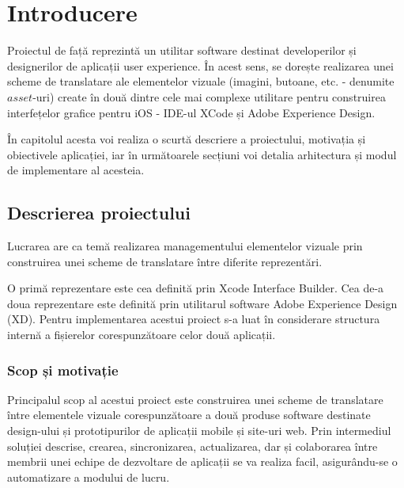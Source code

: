 \renewcommand{\chaptername}{Capitolul}
\renewcommand{\bibname}{Bibliografie}

\chapter{Introducere}
\label{chapter:intro}

\par Proiectul de față reprezintă un utilitar software destinat developerilor și designerilor de aplicații user experience. În acest sens, se dorește realizarea unei scheme de translatare ale elementelor vizuale (imagini, butoane, etc. - denumite $asset$-uri) create în două dintre cele mai complexe utilitare pentru construirea interfețelor grafice pentru iOS -  IDE-ul XCode și  Adobe Experience Design.
\par În capitolul acesta voi realiza o scurtă descriere a proiectului, motivația și obiectivele aplicației, iar în următoarele secțiuni voi detalia arhitectura și modul de implementare al acesteia.

\section{Descrierea proiectului}
\label{sec:proj}
\par Lucrarea are ca temă realizarea managementului elementelor vizuale prin construirea unei scheme de translatare între diferite reprezentări.  
\par O primă reprezentare este cea definită prin Xcode Interface Builder. Cea de-a doua reprezentare este definită prin utilitarul software Adobe Experience Design (XD). 
Pentru implementarea acestui proiect s-a luat în considerare structura internă a fișierelor corespunzătoare celor două aplicații.



\subsection{Scop și motivație}
\label{sub-sec:proj-scope}
Principalul scop al acestui proiect este construirea unei scheme de translatare între elementele vizuale corespunzătoare a două produse software destinate design-ului și prototipurilor de aplicații mobile și site-uri web. Prin intermediul soluției descrise, crearea, sincronizarea, actualizarea, dar și colaborarea între membrii unei echipe de dezvoltare de aplicații se va realiza facil, asigurându-se o automatizare a modului de lucru.

